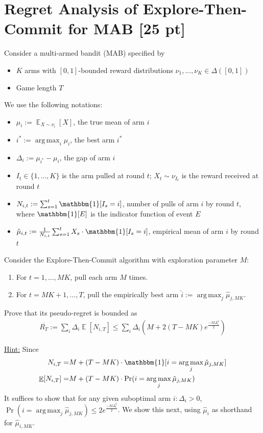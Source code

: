 \documentclass[11pt]{article}
\theoremstyle{case}
\DeclareMathOperator{\E}{\mathbb{E}}
\DeclareMathOperator*{\argmax}{arg\,max}
\begin{document}
\newpage
\section{Regret Analysis of Explore-Then-Commit for MAB [25 pt]}
Consider a multi-armed bandit (MAB) specified by
\begin{itemize}
    \item $K$ arms with $[0,1]$-bounded reward  distributions $\nu_1,...,\nu_K\in\Delta([0,1])$
    \item Game length $T$
\end{itemize}
We use the following notations:
\begin{itemize}
    \item $\mu_i:=\E_{X\sim\nu_i}[X]$, the true mean of arm $i$ 
    \item $i^*:=\argmax_i \mu_i$, the best arm $i^*$
    \item $\Delta_i:=\mu_{i^*} -\mu_{i} $, the gap of arm $i$
    \item $I_t\in\{1,...,K\}$ is the arm pulled at round $t$;
    $X_t\sim\nu_{I_t}$ is the reward received at round $t$
    \item $N_{i,t}:=\sum_{s=1}^{t}\mathbbm{1}[I_s=i]$, number of pulls of arm $i$ by round $t$, where $\mathbbm{1}[E]$ is the indicator function of event $E$
    \item $\hat{\mu}_{i,t}:=\frac{1}{N_{i,t}}\sum_{s=1}^{t}X_s \cdot \mathbbm{1}[I_s=i]$, empirical mean of arm $i$ by round $t$
\end{itemize}
Consider the Explore-Then-Commit algorithm with exploration parameter $M$:
\begin{enumerate}
    \item For $t=1,...,MK$, pull each arm $M$ times.
    \item For $t=MK+1,...,T$, pull the empirically best arm $\hat{i}:=\argmax_j \hat{\mu}_{j, MK}$.
\end{enumerate}
Prove that its pseudo-regret is bounded as 
\begin{align*}
    \overline{R_T}:=\sum_i \Delta_i\E[N_{i,T}] 
    \leq \sum_i \Delta_i \left(M+2(T-MK)e^{\frac{-M\Delta_i^2}{2}}\right)
\end{align*}

\underline{Hint:}
Since 
\begin{align*}
    N_{i,T} =& M + (T-MK)\cdot \mathbbm{1}[i=\argmax_j \hat{\mu}_{j, MK}] \\
    \E[N_{i,T}] =& M + (T-MK)\cdot \Pr(i=\argmax_j \hat{\mu}_{j, MK})
\end{align*}
It suffices to show that for any given suboptimal arm $i: \Delta_i>0$, $\Pr(i=\argmax_j \hat{\mu}_{j, MK})\leq 2e^{\frac{-M\Delta_i^2}{2}}$. We show this next, using $\hat{\mu}_i$ as shorthand for $\hat{\mu}_{i,MK}$.
\end{document}
